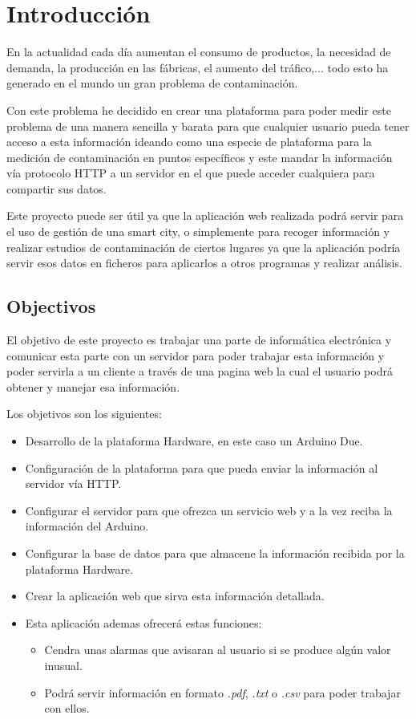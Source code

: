 
\chapter{Introducción}

	En la actualidad cada día aumentan el consumo de productos, la necesidad de demanda, la producción en las fábricas, el aumento del tráfico,... todo esto ha generado en el mundo un gran problema de contaminación.
	
	Con este problema he decidido en crear una plataforma para poder medir este problema de una manera sencilla y barata para que cualquier usuario pueda tener acceso a esta información ideando como una especie de plataforma para la medición de contaminación en puntos específicos y este mandar la información vía protocolo HTTP a un servidor en el que puede acceder cualquiera para compartir sus datos.
	
	Este proyecto puede ser útil ya que la aplicación web realizada podrá servir para el uso de gestión de una smart city, o simplemente para recoger información y realizar estudios de contaminación de ciertos lugares ya que la aplicación podría servir esos datos en ficheros para aplicarlos a otros programas y realizar análisis.

\section{Objectivos}

El objetivo de este proyecto es trabajar una parte de informática electrónica y comunicar esta parte con un servidor para poder trabajar esta información y poder servirla a un cliente a través de una pagina web la cual el usuario podrá obtener y manejar esa información.

Los objetivos son los siguientes:

\begin{itemize}
\item Desarrollo de la plataforma Hardware, en este caso un Arduino Due.
\item Configuración de la plataforma para que pueda enviar la información al servidor vía HTTP.
\item Configurar el servidor para que ofrezca un servicio web y a la vez reciba la información del Arduino.
\item Configurar la base de datos para que almacene la información recibida por la plataforma Hardware.
\item Crear la aplicación web que sirva esta información detallada.
\item Esta aplicación ademas ofrecerá estas funciones:
	\begin{itemize}
	\item Cendra unas alarmas que avisaran al usuario si se produce algún valor inusual.
	\item Podrá servir información en formato \textit{.pdf}, \textit{.txt} o \textit{.csv} para poder trabajar con ellos.
	
	\end{itemize}
\end{itemize}


